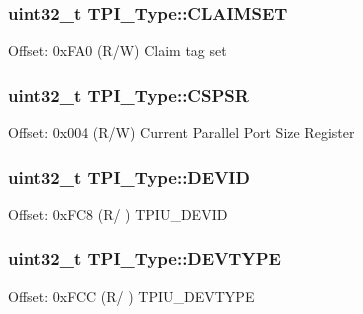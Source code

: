 \subsubsection[{\texorpdfstring{C\+L\+A\+I\+M\+S\+ET}{CLAIMSET}}]{ uint32\+\_\+t T\+P\+I\+\_\+\+Type\+::\+C\+L\+A\+I\+M\+S\+ET}\hypertarget{structTPI__Type_a2e4d5a07fabd771fa942a171230a0a84}{}\label{structTPI__Type_a2e4d5a07fabd771fa942a171230a0a84}
Offset\+: 0x\+F\+A0 (R/W) Claim tag set 
\subsubsection[{\texorpdfstring{C\+S\+P\+SR}{CSPSR}}]{ uint32\+\_\+t T\+P\+I\+\_\+\+Type\+::\+C\+S\+P\+SR}\hypertarget{structTPI__Type_aa723ef3d38237aa2465779b3cc73a94a}{}\label{structTPI__Type_aa723ef3d38237aa2465779b3cc73a94a}
Offset\+: 0x004 (R/W) Current Parallel Port Size Register 
\subsubsection[{\texorpdfstring{D\+E\+V\+ID}{DEVID}}]{ uint32\+\_\+t T\+P\+I\+\_\+\+Type\+::\+D\+E\+V\+ID}\hypertarget{structTPI__Type_a4b2e0d680cf7e26728ca8966363a938d}{}\label{structTPI__Type_a4b2e0d680cf7e26728ca8966363a938d}
Offset\+: 0x\+F\+C8 (R/ ) T\+P\+I\+U\+\_\+\+D\+E\+V\+ID 
\subsubsection[{\texorpdfstring{D\+E\+V\+T\+Y\+PE}{DEVTYPE}}]{ uint32\+\_\+t T\+P\+I\+\_\+\+Type\+::\+D\+E\+V\+T\+Y\+PE}\hypertarget{structTPI__Type_a16d12c5b1e12f764fa3ec4a51c5f0f35}{}\label{structTPI__Type_a16d12c5b1e12f764fa3ec4a51c5f0f35}
Offset\+: 0x\+F\+CC (R/ ) T\+P\+I\+U\+\_\+\+D\+E\+V\+T\+Y\+PE 
